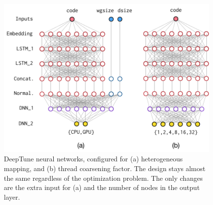\begin{figure}[t!]
  \centering
  \includegraphics[width=\columnwidth]{img/nn} %
  \vspace{-1.5em}%
  \caption{%
    DeepTune neural networks, configured for (a) heterogeneous mapping, and (b)
    thread coarsening factor. The design stays almost the same regardless of the
    optimization problem. The only changes are the extra input for (a) and the
    number of nodes in the output layer.%
  }%
  \label{fig:nn}
\end{figure}
